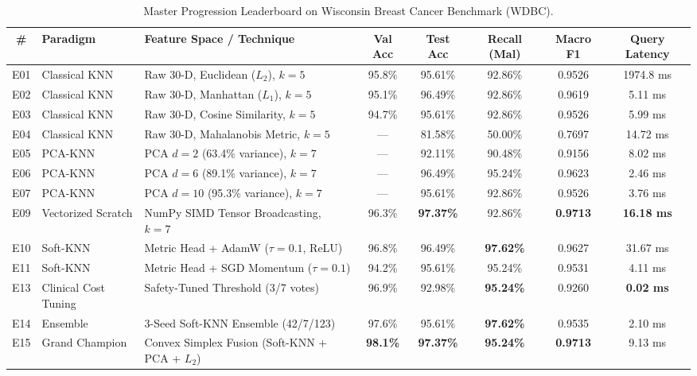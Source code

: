 \documentclass[10pt,twocolumn,letterpaper]{article}
\begin{document}
\begin{table}[t]
\centering
\caption{Master Progression Leaderboard on Wisconsin Breast Cancer Benchmark (WDBC).}
\small
\begin{tabular}{cllccccc}
\toprule
\# & Paradigm & Feature Space / Technique & Val Acc & Test Acc & Recall (Mal) & Macro F1 & Query Latency \\
\midrule
E01 & Classical KNN & Raw 30-D, Euclidean ($L_2$), $k=5$ & 95.8\% & 95.61\% & 92.86\% & 0.9526 & 1974.8 ms \\
E02 & Classical KNN & Raw 30-D, Manhattan ($L_1$), $k=5$ & 95.1\% & 96.49\% & 92.86\% & 0.9619 & 5.11 ms \\
E03 & Classical KNN & Raw 30-D, Cosine Similarity, $k=5$ & 94.7\% & 95.61\% & 92.86\% & 0.9526 & 5.99 ms \\
E04 & Classical KNN & Raw 30-D, Mahalanobis Metric, $k=5$ & — & 81.58\% & 50.00\% & 0.7697 & 14.72 ms \\
E05 & PCA-KNN & PCA $d=2$ (63.4\% variance), $k=7$ & — & 92.11\% & 90.48\% & 0.9156 & 8.02 ms \\
E06 & PCA-KNN & PCA $d=6$ (89.1\% variance), $k=7$ & — & 96.49\% & 95.24\% & 0.9623 & 2.46 ms \\
E07 & PCA-KNN & PCA $d=10$ (95.3\% variance), $k=7$ & — & 95.61\% & 92.86\% & 0.9526 & 3.76 ms \\
E09 & Vectorized Scratch & NumPy SIMD Tensor Broadcasting, $k=7$ & 96.3\% & \textbf{97.37\%} & 92.86\% & \textbf{0.9713} & \textbf{16.18 ms} \\
E10 & Soft-KNN & Metric Head + AdamW ($\tau=0.1$, ReLU) & 96.8\% & 96.49\% & \textbf{97.62\%} & 0.9627 & 31.67 ms \\
E11 & Soft-KNN & Metric Head + SGD Momentum ($\tau=0.1$) & 94.2\% & 95.61\% & 95.24\% & 0.9531 & 4.11 ms \\
E13 & Clinical Cost Tuning & Safety-Tuned Threshold (3/7 votes) & 96.9\% & 92.98\% & \textbf{95.24\%} & 0.9260 & \textbf{0.02 ms} \\
E14 & Ensemble & 3-Seed Soft-KNN Ensemble (42/7/123) & 97.6\% & 95.61\% & \textbf{97.62\%} & 0.9535 & 2.10 ms \\
E15 & Grand Champion & Convex Simplex Fusion (Soft-KNN + PCA + $L_2$) & \textbf{98.1\%} & \textbf{97.37\%} & \textbf{95.24\%} & \textbf{0.9713} & 9.13 ms \\
\bottomrule
\end{tabular}
\end{table}
\end{document}
